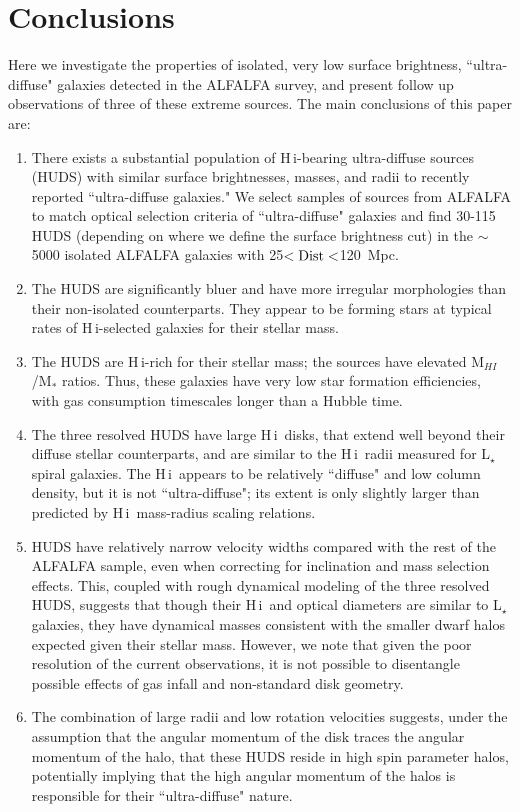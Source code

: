 \documentclass[twocolumn]{aastex6}
\newcommand{\hi}{H{\sc\,i}}
\begin{document}
\section{Conclusions}
\label{conclusions}

Here we investigate the properties of isolated, very low surface brightness, ``ultra-diffuse" galaxies detected in the ALFALFA survey, and present follow up observations of three of these extreme sources. The main conclusions of this paper are:
\begin{enumerate}
\itemsep0em
\item There exists a substantial population of \hi-bearing ultra-diffuse sources (HUDS) with similar surface brightnesses, masses, and radii to recently reported ``ultra-diffuse galaxies." We select samples of sources from ALFALFA to match optical selection criteria of ``ultra-diffuse" galaxies and find 30-115 HUDS (depending on where we define the surface brightness cut) in the $\sim$5000 isolated ALFALFA galaxies with 25$<{\rm Dist}<$120~Mpc.
\item The HUDS are significantly bluer and have more irregular morphologies than their non-isolated counterparts. They appear to be forming stars at typical rates of \hi-selected galaxies for their stellar mass.
\item The HUDS are \hi-rich for their stellar mass; the sources have elevated M$_{HI}$/M$_{*}$ ratios. Thus, these galaxies have very low star formation efficiencies, with gas consumption timescales longer than a Hubble time.
\item  The three resolved HUDS have large \hi\ disks, that extend well beyond their diffuse stellar counterparts, and are similar to the \hi\ radii measured for L$_{\star}$ spiral galaxies. The \hi\ appears to be relatively ``diffuse" and low column density, but it is not ``ultra-diffuse"; its extent is only slightly larger than predicted by \hi\ mass-radius scaling relations.
\item HUDS have relatively narrow velocity widths compared with the rest of the ALFALFA sample, even when correcting for inclination and mass selection effects. This, coupled with rough dynamical modeling of the three resolved HUDS, suggests that though their \hi\ and optical diameters are similar to L$_{\star}$ galaxies, they have dynamical masses consistent with the smaller dwarf halos expected given their stellar mass. However, we note that given the poor resolution of the current observations, it is not possible to disentangle possible effects of gas infall and non-standard disk geometry.
\item The combination of large radii and low rotation velocities suggests, under the assumption that the angular momentum of the disk traces the angular momentum of the halo, that these HUDS reside in high spin parameter halos, potentially implying that the high angular momentum of the halos is responsible for their ``ultra-diffuse" nature.
\end{enumerate}
\end{document}
